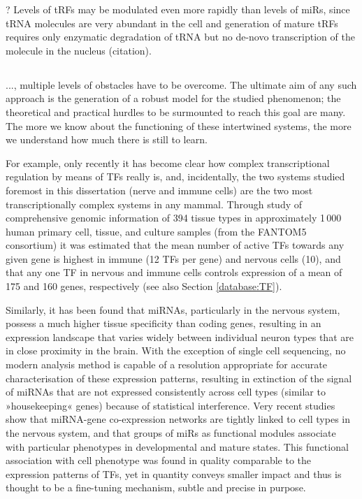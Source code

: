 ? Levels of tRFs may be modulated even more rapidly than levels of miRs, since tRNA molecules are very abundant in the cell and generation of mature tRFs requires only enzymatic degradation of tRNA but no de-novo transcription of the molecule in the nucleus (citation).

\subsection[Nested Multimodal Transcriptional Interactions - The Need for Connectomics]{}
..., multiple levels of obstacles have to be overcome. The ultimate aim of any such approach is the generation of a robust model for the studied phenomenon; the theoretical and practical hurdles to be surmounted to reach this goal are many. The more we know about the functioning of these intertwined systems, the more we understand how much there is still to learn. 

For example, only recently it has become clear how complex transcriptional regulation by means of TFs really is, and, incidentally, the two systems studied foremost in this dissertation (nerve and immune cells) are the two most transcriptionally complex systems in any mammal. Through study of comprehensive genomic information of 394 tissue types in approximately 1\,000 human primary cell, tissue, and culture samples (from the FANTOM5 consortium) it was estimated that the mean number of active TFs towards any given gene is highest in immune (12 TFs per gene) and nervous cells (10), and that any one TF in nervous and immune cells controls expression of a mean of 175 and 160 genes, respectively\cite{Marbach2016} (see also Section \ref{database:TF}). 

Similarly, it has been found that miRNAs, particularly in the nervous system, possess a much higher tissue specificity than coding genes, resulting in an expression landscape that varies widely between individual neuron types that are in close proximity in the brain. With the exception of single cell sequencing, no modern analysis method is capable of a resolution appropriate for accurate characterisation of these expression patterns, resulting in extinction of the signal of miRNAs that are not expressed consistently across cell types (similar to »housekeeping« genes) because of statistical interference. Very recent studies show that miRNA-gene co-expression networks are tightly linked to cell types in the nervous system, and that groups of miRs as functional modules associate with particular phenotypes in developmental and mature states\cite{Nowakowski2018}. This functional association with cell phenotype was found in quality comparable to the expression patterns of TFs, yet in quantity conveys smaller impact and thus is thought to be a fine-tuning mechanism, subtle and precise in purpose. 

